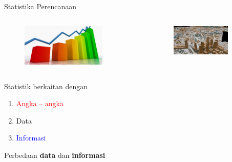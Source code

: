 \documentclass[main.tex]{subfiles}
\begin{document}
\begin{frame}{Statistika Perencanaan}
	\begin{columns}[c]
		\begin{column}{.5\textwidth}
			\begin{figure}
				\centering
				\includegraphics[width=0.8\textwidth]{figures/statistik}
			\end{figure}
		\end{column}
		\begin{column}{.5\textwidth}
			\begin{figure}
				\centering
				\includegraphics[width=0.8\textwidth]{figures/planologi}
			\end{figure}
		\end{column}
	\end{columns}
\end{frame}

\begin{frame}[c]
	\large Statistik berkaitan dengan
	\begin{enumerate}
		\item \textcolor{red}{Angka – angka}
		\item Data
		\item \textcolor{blue}{Informasi}
	\end{enumerate}
	\large Perbedaan
	\textbf{data} dan \textbf{informasi}
\end{frame}
\end{document}
